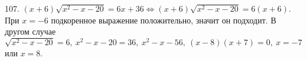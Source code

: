 107. $(x+6)\sqrt{x^2-x-20}=6x+36\Leftrightarrow (x+6)\sqrt{x^2-x-20}=6(x+6).$ При $x=-6$ подкоренное выражение положительно, значит он подходит. В другом случае
$\sqrt{x^2-x-20}=6,\ x^2-x-20=36,\ x^2-x-56,\ (x-8)(x+7)=0,\ x=-7$ или $x=8.$\\

